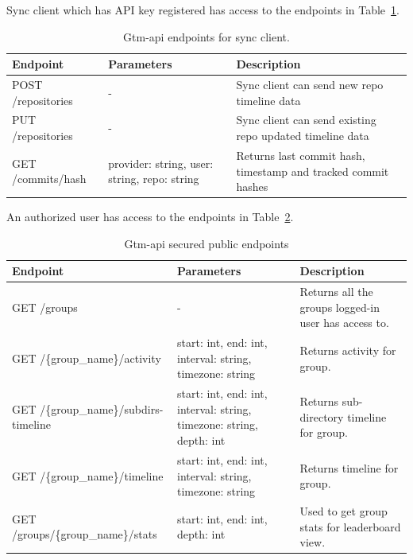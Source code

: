 Sync client which has API key registered has access to the endpoints in Table~\ref{tab:gtm-api-endpoints-for-sync}.
\begin{table}[H]
    \centering
    \begin{tabular}{ | p{5cm} | p{4cm} | p{5cm} |}
        \hline
        \textbf{Endpoint} & \textbf{Parameters} & \textbf{Description}\\
        \hline
        POST /repositories & - & Sync client can send new repo timeline data \\
        \hline
        PUT /repositories & - & Sync client can send existing repo updated timeline data\\
        \hline
        GET /commits/hash & provider: string, user: string, repo: string & Returns last commit hash, timestamp and tracked commit hashes\\
        \hline
    \end{tabular}
    \caption{Gtm-api endpoints for sync client.}
    \label{tab:gtm-api-endpoints-for-sync}
\end{table}

An authorized user has access to the endpoints in Table~\ref{tab:gtm-api-endpoints-secured}.
\begin{table}[H]
    \centering
    \begin{tabular}{ | p{5cm} | p{4cm} | p{5cm} |}
        \hline
        \textbf{Endpoint} & \textbf{Parameters} & \textbf{Description}\\
        \hline
        GET /groups & - & Returns all the groups logged-in user has access to. \\
        \hline
        GET /\{group\_name\}/activity & start: int, end: int, interval: string, timezone: string & Returns activity for group. \\
        \hline
        GET /\{group\_name\}/subdirs-timeline & start: int, end: int, interval: string, timezone: string, depth: int & Returns sub-directory timeline for group. \\
        \hline
        GET /\{group\_name\}/timeline & start: int, end: int, interval: string, timezone: string & Returns timeline for group. \\
        \hline
        GET /groups/\{group\_name\}/stats & start: int, end: int, depth: int & Used to get group stats for leaderboard view.\\
        \hline
    \end{tabular}
    \caption{Gtm-api secured public endpoints}
    \label{tab:gtm-api-endpoints-secured}
\end{table}

